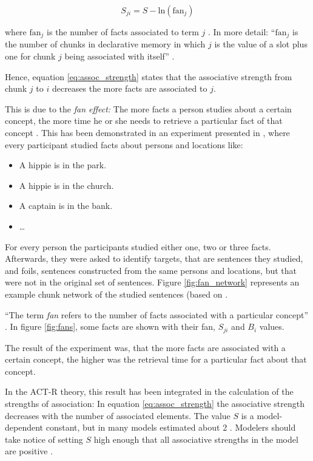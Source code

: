 \begin{equation}
\label{eq:assoc_strength}
S_{ji} = S - \mathrm{ln}(\mathrm{fan}_j)
\end{equation}

where $\mathrm{fan}_j$ is the number of facts associated to term $j$ \cite[1042]{anderson_implications_2000}. In more detail: ``$\mathrm{fan}_j$ is the number of chunks in declarative memory in which $j$ is the value of a slot plus one for chunk $j$ being associated with itself'' \cite[unit 5, p. 2]{actr_tutorial}.  

Hence, equation \eqref{eq:assoc_strength} states that the associative strength from chunk $j$ to $i$ decreases the more facts are associated to $j$.

This is due to the \emph{fan effect:} The more facts a person studies about a certain concept, the more time he or she needs to retrieve a particular fact of that concept \cite[186]{anderson_fan_1999}. This has been demonstrated in an experiment presented in \cite{anderson_fan_1999}, where every participant studied facts about persons and locations like:

\begin{itemize}
 \item A hippie is in the park.
 \item A hippie is in the church.
 \item A captain is in the bank.
 \item \dots
\end{itemize}

For every person the participants studied either one, two or three facts. Afterwards, they were asked to identify targets, that are sentences they studied, and foils, sentences constructed from the same persons and locations, but that were not in the original set of sentences. Figure \ref{fig:fan_network} represents an example chunk network of the studied sentences (based on \cite[fig. 1]{anderson_fan_1999}.

``The term \emph{fan} refers to the number of facts associated with a particular concept'' \cite[186]{anderson_fan_1999}. In figure \ref{fig:fans}, some facts are shown with their fan, $S_{ji}$ and $B_i$ values.

The result of the experiment was, that the more facts are associated with a certain concept, the higher was the retrieval time for a particular fact about that concept.

In the ACT-R theory, this result has been integrated in the calculation of the strengths of association: In equation \eqref{eq:assoc_strength} the associative strength decreases with the number of associated elements. The value $S$ is a model-dependent constant, but in many models estimated about 2 \cite[1042]{anderson_integrated_2004}. Modelers should take notice of setting $S$ high enough that all associative strengths in the model are positive \cite[unit 5, p. 3]{actr_tutorial}.

